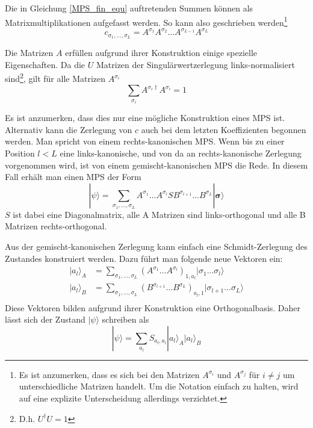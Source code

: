\documentclass[10pt,a4paper]{report}
\newcommand{\SumIndex}{\sigma_1,\ldots,\sigma_L}
\begin{document}
Die in Gleichung \ref{MPS_fin_equ} auftretenden Summen können als Matrixmultiplikationen aufgefasst werden. So kann also geschrieben werden\footnote{Es ist anzumerken, dass es sich bei den Matrizen $A^{\sigma_i}$ und $A^{\sigma_j}$ für $i\neq j$ um unterschiedliche Matrizen handelt. Um die Notation einfach zu halten, wird auf eine explizite Unterscheidung allerdings verzichtet.}
\begin{equation}
c_{\SumIndex}=A^{\sigma_1}A^{\sigma_2}\ldots A^{\sigma_{L-1}}A^{\sigma_L}
\end{equation}

Die Matrizen $A$ erfüllen aufgrund ihrer Konstruktion einige spezielle Eigenschaften. Da die $U$ Matrizen der Singulärwertzerlegung links-normalisiert sind\footnote{D.h. $U^\dagger U=1$}, gilt für alle Matrizen $A^{\sigma_i}$
\begin{equation}
\sum_{\sigma_i}A^{\sigma_i \dagger}A^{\sigma_i}=1
\end{equation}

Es ist anzumerken, dass dies nur eine mögliche Konstruktion eines MPS ist. Alternativ kann die Zerlegung von $c$ auch bei dem letzten Koeffizienten begonnen werden. Man spricht von einem rechts-kanonischen MPS. Wenn bis zu einer Position $l<L$ eine links-kanonische, und von da an rechts-kanonische Zerlegung vorgenommen wird, ist von einem gemischt-kanonischen MPS die Rede. In diesem Fall erhält man einen MPS der Form
\begin{equation}
|\psi\rangle=\sum_{\SumIndex}A^{\sigma_1}\ldots A^{\sigma_l}S B^{\sigma_{l+1}}\ldots B^{\sigma_L}|\bm{\sigma}\rangle
\end{equation}
$S$ ist dabei eine Diagonalmatrix, alle A Matrizen sind links-orthogonal und alle B Matrizen rechts-orthogonal.

Aus der gemischt-kanonischen Zerlegung kann einfach eine Schmidt-Zerlegung des Zustandes konstruiert werden. Dazu führt man folgende neue Vektoren ein:
\begin{equation}
\begin{split}
|a_l\rangle_A&=\sum_{\SumIndex}(A^{\sigma_1}\ldots A^{\sigma_l})_{1,a_l}|\sigma_1\ldots\sigma_l\rangle \\
|a_l\rangle_B&=\sum_{\SumIndex}(B^{\sigma_{l+1}}\ldots B^{\sigma_L})_{a_l,1}|\sigma_{l+1}\ldots\sigma_L\rangle\\
\end{split}
\end{equation}
Diese Vektoren bilden aufgrund ihrer Konstruktion eine Orthogonalbasis. Daher lässt sich der Zustand $|\psi\rangle$ schreiben als
\begin{equation}
|\psi\rangle=\sum_{a_l}S_{a_l,a_l}|a_l\rangle_A|a_l\rangle_B
\end{equation}
\end{document}
